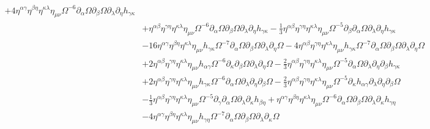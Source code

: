 \documentclass[10pt,letterpaper]{article}
\begin{document}
\begin{align}
 + 4 \eta^{\alpha \gamma} \eta^{\beta \eta} \eta^{\kappa \lambda} \eta_{\mu \nu} \Omega^{-6} \partial_{\alpha}\Omega \partial_{\beta}\Omega \partial_{\lambda}\partial_{\eta}h_{\gamma \kappa}\nonumber\\
& + \eta^{\alpha \beta} \eta^{\gamma \eta} \eta^{\kappa \lambda} \eta_{\mu \nu} \Omega^{-6} \partial_{\alpha}\Omega \partial_{\beta}\Omega \partial_{\lambda}\partial_{\eta}h_{\gamma \kappa}
 -  \tfrac{1}{3} \eta^{\alpha \beta} \eta^{\gamma \eta} \eta^{\kappa \lambda} \eta_{\mu \nu} \Omega^{-5} \partial_{\beta}\partial_{\alpha}\Omega \partial_{\lambda}\partial_{\eta}h_{\gamma \kappa}\nonumber\\
& - 16 \eta^{\alpha \gamma} \eta^{\beta \eta} \eta^{\kappa \lambda} \eta_{\mu \nu} h_{\gamma \kappa} \Omega^{-7} \partial_{\alpha}\Omega \partial_{\beta}\Omega \partial_{\lambda}\partial_{\eta}\Omega
 - 4 \eta^{\alpha \beta} \eta^{\gamma \eta} \eta^{\kappa \lambda} \eta_{\mu \nu} h_{\gamma \kappa} \Omega^{-7} \partial_{\alpha}\Omega \partial_{\beta}\Omega \partial_{\lambda}\partial_{\eta}\Omega\nonumber\\
& + 2 \eta^{\alpha \beta} \eta^{\gamma \eta} \eta^{\kappa \lambda} \eta_{\mu \nu} h_{\alpha \gamma} \Omega^{-6} \partial_{\kappa}\partial_{\beta}\Omega \partial_{\lambda}\partial_{\eta}\Omega
 -  \tfrac{2}{3} \eta^{\alpha \beta} \eta^{\gamma \eta} \eta^{\kappa \lambda} \eta_{\mu \nu} \Omega^{-5} \partial_{\alpha}\Omega \partial_{\lambda}\partial_{\eta}\partial_{\beta}h_{\gamma \kappa}\nonumber\\
& + 2 \eta^{\alpha \beta} \eta^{\gamma \eta} \eta^{\kappa \lambda} \eta_{\mu \nu} h_{\gamma \kappa} \Omega^{-6} \partial_{\alpha}\Omega \partial_{\lambda}\partial_{\eta}\partial_{\beta}\Omega
 -  \tfrac{2}{3} \eta^{\alpha \beta} \eta^{\gamma \eta} \eta^{\kappa \lambda} \eta_{\mu \nu} \Omega^{-5} \partial_{\kappa}h_{\alpha \gamma} \partial_{\lambda}\partial_{\eta}\partial_{\beta}\Omega\nonumber\\
& -  \tfrac{1}{3} \eta^{\alpha \beta} \eta^{\gamma \eta} \eta^{\kappa \lambda} \eta_{\mu \nu} \Omega^{-5} \partial_{\gamma}\partial_{\alpha}\Omega \partial_{\lambda}\partial_{\kappa}h_{\beta \eta}
 + \eta^{\alpha \gamma} \eta^{\beta \eta} \eta^{\kappa \lambda} \eta_{\mu \nu} \Omega^{-6} \partial_{\alpha}\Omega \partial_{\beta}\Omega \partial_{\lambda}\partial_{\kappa}h_{\gamma \eta}\nonumber\\
& - 4 \eta^{\alpha \gamma} \eta^{\beta \eta} \eta^{\kappa \lambda} \eta_{\mu \nu} h_{\gamma \eta} \Omega^{-7} \partial_{\alpha}\Omega \partial_{\beta}\Omega \partial_{\lambda}\partial_{\kappa}\Omega

\end{align}
\end{document}
